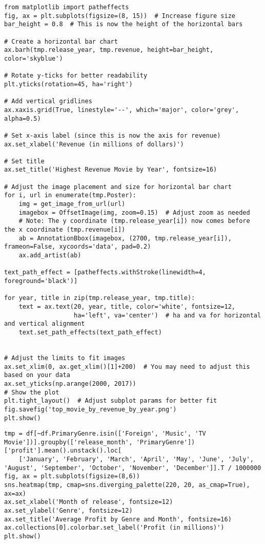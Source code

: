 \begin{lstlisting}
from matplotlib import patheffects
fig, ax = plt.subplots(figsize=(8, 15))  # Increase figure size
bar_height = 0.8  # This is now the height of the horizontal bars

# Create a horizontal bar chart
ax.barh(tmp.release_year, tmp.revenue, height=bar_height, color='skyblue')

# Rotate y-ticks for better readability
plt.yticks(rotation=45, ha='right')

# Add vertical gridlines
ax.xaxis.grid(True, linestyle='--', which='major', color='grey', alpha=0.5)

# Set x-axis label (since this is now the axis for revenue)
ax.set_xlabel('Revenue (in millions of dollars)')

# Set title
ax.set_title('Highest Revenue Movie by Year', fontsize=16)

# Adjust the image placement and size for horizontal bar chart
for i, url in enumerate(tmp.Poster):
    img = get_image_from_url(url)
    imagebox = OffsetImage(img, zoom=0.15)  # Adjust zoom as needed
    # Note: The y coordinate (tmp.release_year[i]) now comes before the x coordinate (tmp.revenue[i])
    ab = AnnotationBbox(imagebox, (2700, tmp.release_year[i]), frameon=False, xycoords='data', pad=0.2)
    ax.add_artist(ab)
    
text_path_effect = [patheffects.withStroke(linewidth=4, foreground='black')]

for year, title in zip(tmp.release_year, tmp.title):
    text = ax.text(20, year, title, color='white', fontsize=12, 
                   ha='left', va='center')  # ha and va for horizontal and vertical alignment
    text.set_path_effects(text_path_effect)


# Adjust the limits to fit images
ax.set_xlim(0, ax.get_xlim()[1]+200)  # You may need to adjust this based on your data
ax.set_yticks(np.arange(2000, 2017))
# Show the plot
plt.tight_layout()  # Adjust subplot params for better fit
fig.savefig('top_movie_by_revenue_by_year.png')
plt.show()
\end{lstlisting}

\begin{lstlisting}
tmp = df[~df.PrimaryGenre.isin(['Foreign', 'Music', 'TV Movie'])].groupby(['release_month', 'PrimaryGenre'])['profit'].mean().unstack().loc[
    ['January', 'February', 'March', 'April', 'May', 'June', 'July', 'August', 'September', 'October', 'November', 'December']].T / 1000000
fig, ax = plt.subplots(figsize=(8,6))
sns.heatmap(tmp, cmap=sns.diverging_palette(220, 20, as_cmap=True), ax=ax)
ax.set_xlabel('Month of release', fontsize=12)
ax.set_ylabel('Genre', fontsize=12)
ax.set_title('Average Profit by Genre and Month', fontsize=16)
ax.collections[0].colorbar.set_label('Profit (in millions)')
plt.show()
\end{lstlisting}

